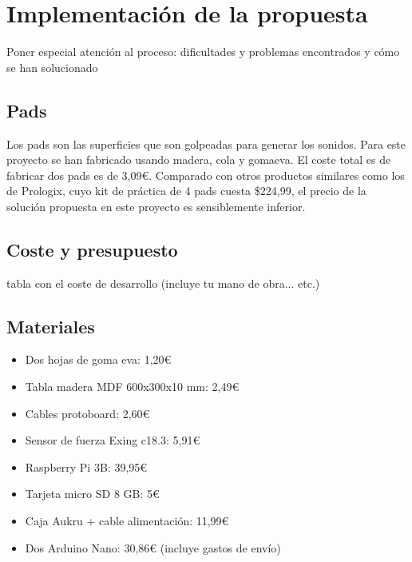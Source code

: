 \documentclass{article}
\begin{document}
\section{Implementación de la propuesta}\label{sec:Implementacion}

 Poner especial atención al proceso: dificultades y problemas encontrados y cómo se han solucionado

 \subsection{Pads}
 Los pads son las superficies que son golpeadas para generar los sonidos. Para este proyecto se han fabricado
 usando madera, cola y gomaeva\cite{GomaEva}. El coste total es de fabricar dos pads es de 3,09\euro{}. Comparado
 con otros productos similares como los de Prologix\cite{practice_pad}, cuyo kit de práctica de 4 pads cuesta
 \$224,99, el precio de la solución propuesta en este proyecto es sensiblemente inferior.

 \subsection{Coste y presupuesto}

  tabla con el coste de desarrollo (incluye tu mano de obra... etc.)

  \subsection{Materiales}
  \begin{itemize}
      \item Dos hojas de goma eva: 1,20\euro{}
      \item Tabla madera MDF 600x300x10 mm: 2,49\euro{}
      \item Cables protoboard: 2,60\euro{}
      \item Sensor de fuerza Exing c18.3: 5,91\euro{}
      \item Raspberry Pi 3B: 39,95\euro{}
      \item Tarjeta micro SD 8 GB: 5\euro{}
      \item Caja Aukru + cable alimentación: 11,99\euro{}
      \item Dos Arduino Nano: 30,86\euro{} (incluye gastos de envío)
  \end{itemize}
\end{document}
